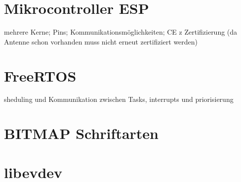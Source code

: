 \section{Mikrocontroller ESP}
mehrere Kerne; Pins; Kommunikationsmöglichkeiten; CE z
Zertifizierung (da Antenne schon vorhanden muss nicht erneut zertifiziert werden)

\section{FreeRTOS}
sheduling und Kommunikation zwischen Tasks, interrupts und priorisierung

\section{BITMAP Schriftarten}

\section{libevdev}